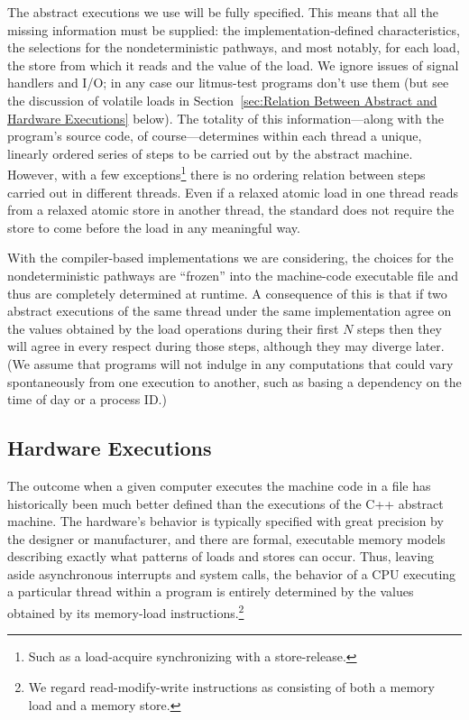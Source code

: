 The abstract executions we use will be fully specified.
This means that all the missing information must be supplied:
the implementation-defined characteristics, the selections for the
nondeterministic pathways, and most notably, for each load, the store
from which it reads and the value of the load.
We ignore issues of signal handlers and I/O;
in any case our litmus-test programs don't use them
(but see the discussion of volatile loads in
Section~\ref{sec:Relation Between Abstract and Hardware Executions} below).
The totality of this information---along with the program's source
code, of course---determines within each thread a unique, linearly
ordered series of steps to be carried out by the abstract machine.
However, with a few exceptions\footnote{
	Such as a load-acquire synchronizing with a store-release.}
there is no ordering relation between steps carried out
in different threads.
Even if a relaxed atomic load in one thread reads from a relaxed
atomic store in another thread, the standard does not require the
store to come before the load in any meaningful way.

With the compiler-based implementations we are considering,
the choices for the nondeterministic pathways are ``frozen'' into the
machine-code executable file and thus are completely determined
at runtime.
A consequence of this is that if two abstract executions of the same
thread under the same implementation agree on the values obtained by
the load operations during their first $N$ steps then they will agree
in every respect during those steps, although they may diverge later.
(We assume that programs will not indulge in any computations that
could vary spontaneously from one execution to another,
such as basing a dependency on the time of day or a process ID.)

\subsection{Hardware Executions}
\label{sec:Hardware Executions}

The outcome when a given computer executes the machine code in a file
has historically been much better defined than the executions of the
C++ abstract machine.
The hardware's behavior is typically specified with great precision by
the designer or manufacturer, and there are formal, executable memory models
describing exactly what patterns of loads and stores can occur.
Thus, leaving aside asynchronous interrupts and system
calls, the behavior of a CPU executing a particular thread within a
program is entirely determined by the values obtained by its
memory-load instructions.\footnote{
	We regard read-modify-write instructions as consisting of both a
	memory load and a memory store.}

